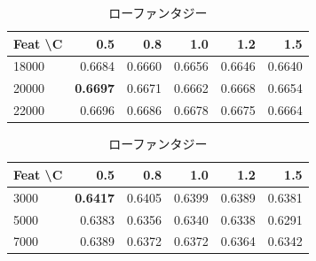 \documentclass[uplatex, dvipdfmx, 11pt, a4paper, report]{jsbook}
\begin{document}
\begin{table}[H]
    \centering
    \small
    \begin{minipage}[t]{0.48\textwidth}
        \centering
        \caption{ハイファンタジー}
        \begin{tabular}{l|rrrrr}
            \hline
            Feat \textbackslash C & 0.5 & 0.8 & 1.0 & 1.2 & 1.5 \\ \hline
            18000 & 0.6684 & 0.6660 & 0.6656 & 0.6646 & 0.6640 \\
            20000 & \textbf{0.6697} & 0.6671 & 0.6662 & 0.6668 & 0.6654 \\
            22000 & 0.6696 & 0.6686 & 0.6678 & 0.6675 & 0.6664 \\ \hline
        \end{tabular}
    \end{minipage}
    \hfill
    \begin{minipage}[t]{0.48\textwidth}
        \centering
        \caption{ローファンタジー}
        \begin{tabular}{l|rrrrr}
            \hline
            Feat \textbackslash C & 0.5 & 0.8 & 1.0 & 1.2 & 1.5 \\ \hline
            3000 & \textbf{0.6417} & 0.6405 & 0.6399 & 0.6389 & 0.6381 \\
            5000 & 0.6383 & 0.6356 & 0.6340 & 0.6338 & 0.6291 \\
            7000 & 0.6389 & 0.6372 & 0.6372 & 0.6364 & 0.6342 \\ \hline
        \end{tabular}
    \end{minipage}
\end{table}
\end{document}
